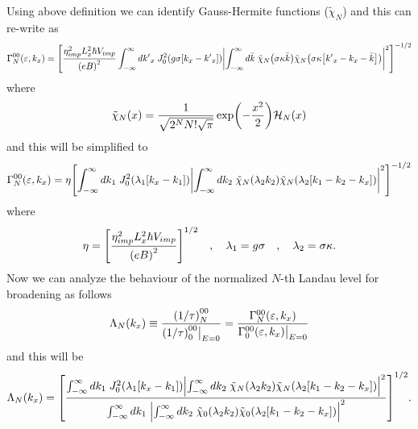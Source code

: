 \noindent
Using above definition we can identify Gauss-Hermite functions ($\tilde{\chi}_N$) and this can re-write as
\begin{equation} \label{5.11}
  \begin{aligned}
    \Gamma^{00}_{N}(\varepsilon,k_x)  =
    \qty[
    \frac { \eta_{imp}^2 L_x^2 \hbar V_{imp}}{\qty(eB)^2}
    \int_{-\infty}^{\infty} d {k'}_x \;
    J_0^2\qty(g\sigma[{k}_x - {k'}_x])
    \qty|
    \int_{-\infty}^{\infty} d\bar{k} \;
    \tilde{\chi}_{N}\qty(\sigma\kappa\bar{k})
    \tilde{\chi}_{N}\qty(\sigma\kappa\qty[{k'}_x - {k}_x - \bar{k}])|^2
    ]^{-1/2}
  \end{aligned}
\end{equation}
where
\begin{equation} \label{5.12}
  \tilde{\chi}_N(x) = \frac{1}{\sqrt{2^{N}N!\sqrt{\pi}}}
  \exp(-\frac{x^2}{2})
  \mathcal{H}_N\qty(x)
\end{equation}
and this will be simplified to
\begin{equation} \label{5.13}
  \begin{aligned}
    \Gamma^{00}_{N}(\varepsilon,k_x)  =
    \eta
    \qty[
    \int_{-\infty}^{\infty} d {k}_1 \;
    J_0^2\qty(\lambda_1[{k}_x - {k}_1])
    \qty|
    \int_{-\infty}^{\infty} d{k}_2 \;
    \tilde{\chi}_{N}\qty(\lambda_2 k_2)
    \tilde{\chi}_{N}\qty(\lambda_2 \qty[{k}_1 - {k}_2 - {k}_x])|^2
    ]^{-1/2}
  \end{aligned}
\end{equation}
where
\begin{equation} \label{5.14}
    \eta = \qty[\frac { \eta_{imp}^2 L_x^2 \hbar V_{imp}}{\qty(eB)^2}]^{1/2} \quad,\quad
    \lambda_1 = g\sigma \quad,\quad
    \lambda_2 = \sigma \kappa.
\end{equation}
\noindent
Now we can analyze the behaviour of the normalized $N$-th Landau level for broadening as follows
\begin{equation} \label{5.15}
    \Lambda_N(k_x) \equiv
    \frac{\qty(1/\tau)^{00}_{N}}{\qty(1/\tau)^{00}_{0}\big|_{E=0}} =
    \frac{\Gamma^{00}_{N}(\varepsilon,k_x)}{\Gamma^{00}_{0}(\varepsilon,k_x)\big|_{E=0}}
\end{equation}
and this will be
\begin{equation} \label{5.16}
    \Lambda_N (k_x) =
    \qty[
    \frac
    {\int_{-\infty}^{\infty} d {k}_1 \;
    J_0^2\qty(\lambda_1[{k}_x - {k}_1])
    \qty|
    \int_{-\infty}^{\infty} d{k}_2 \;
    \tilde{\chi}_{N}\qty(\lambda_2 k_2)
    \tilde{\chi}_{N}\qty(\lambda_2 \qty[{k}_1 - {k}_2 - {k}_x])|^2}
    {\int_{-\infty}^{\infty} d {k}_1 \;
    \qty|
    \int_{-\infty}^{\infty} d{k}_2 \;
    \tilde{\chi}_{0}\qty(\lambda_2 k_2)
    \tilde{\chi}_{0}\qty(\lambda_2 \qty[{k}_1 - {k}_2 - {k}_x])|^2}
    ]^{1/2}.
\end{equation}

